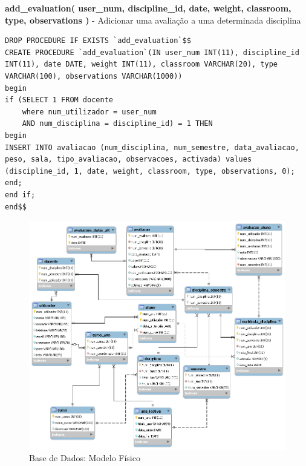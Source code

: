 \begin{list}{\textbf{-}}{\textbf{STORED PROCEDURES}}
\item \textbf{add\_evaluation( user\_num, discipline\_id, date, weight, classroom, type, observations )} - Adicionar uma avaliação a uma determinada disciplina
\begin{lstlisting}
DROP PROCEDURE IF EXISTS `add_evaluation`$$
CREATE PROCEDURE `add_evaluation`(IN user_num INT(11), discipline_id INT(11), date DATE, weight INT(11), classroom VARCHAR(20), type VARCHAR(100), observations VARCHAR(1000))
begin
if (SELECT 1 FROM docente 
	where num_utilizador = user_num 
	AND num_disciplina = discipline_id) = 1 THEN 
begin
INSERT INTO avaliacao (num_disciplina, num_semestre, data_avaliacao, peso, sala, tipo_avaliacao, observacoes, activada) values (discipline_id, 1, date, weight, classroom, type, observations, 0); 
end;
end if;
end$$
\end{lstlisting}

\end{list}

\begin{figure}[!htbp]
\centering
\includegraphics[width=17cm]{imagens/base_de_dados.png}
\caption{Base de Dados: Modelo Físico}
\label{fig:modelo_fisico}
\end{figure}

